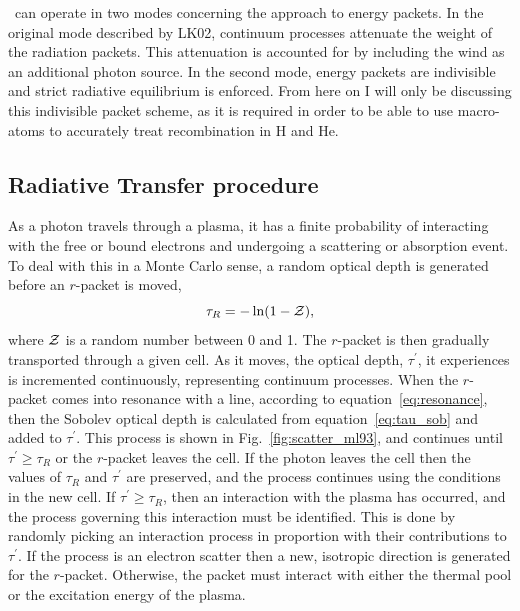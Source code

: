 \py\ can operate in two modes concerning the approach to energy packets. 
In the original mode described by LK02, continuum processes attenuate 
the weight of the radiation packets. This attenuation is accounted for 
by including the wind as an additional photon source.
In the second mode, energy packets are indivisible and strict radiative equilibrium is
enforced. From here on I will only be discussing this indivisible packet scheme, 
as it is required in order to be able to use macro-atoms to accurately
treat recombination in H and He.

\subsection{Radiative Transfer procedure}

As a photon travels through a plasma, it has a finite probability
of interacting with the free or bound electrons and undergoing a scattering
or absorption event. To deal with this in a Monte Carlo sense, a random optical 
depth is generated before an $r$-packet is moved,
\begin{equation}
\tau_R = - \ln (1 - {\cal Z}),
\end{equation}
where ${\cal Z}$ is a random number between 0 and 1. 
The $r$-packet is then gradually transported through a given cell. 
As it moves, the optical depth, $\tau^\prime$, it experiences
is incremented continuously, representing continuum processes. When the $r$-packet comes
into resonance with a line, according to equation~\ref{eq:resonance}, then
the Sobolev optical depth is calculated from equation~\ref{eq:tau_sob} and added to 
$\tau^\prime$. This process is shown in Fig.~\ref{fig:scatter_ml93}, and
continues until $\tau^\prime \geq \tau_R$ or the $r$-packet leaves the cell. If the
photon leaves the cell then the values of $\tau_R$ and $\tau^\prime$ are preserved,
and the process continues using the conditions in the new cell. If 
$\tau^\prime \geq \tau_R$, then an interaction with the plasma has occurred, and
the process governing this interaction must be identified. This is done by
randomly picking an interaction process in proportion with their contributions
to $\tau^\prime$. If the process is an electron scatter then a new, isotropic
direction is generated for the $r$-packet. Otherwise, the packet must
interact with either the thermal pool or the excitation energy of the plasma.

